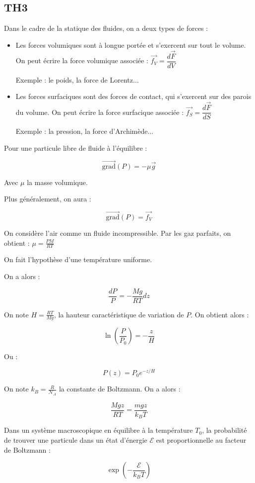 \documentclass[a4paper,12pt]{book}
\newcommand{\Def}[2]{\begin{tcolorbox}[colback=white,colframe=red!10!green!20!blue!75!, title=Définition : #1]#2\end{tcolorbox}}
\newcommand{\Thr}[2]{\begin{tcolorbox}[sharp corners, colback=white,colframe=red!10!blue!30!green!75!, title=Théorème : #1]#2\end{tcolorbox}}
\newcommand{\Grad}{\overrightarrow{\mathrm{grad}}}
\renewcommand{\Vec}[1]{\overrightarrow{#1}}
\begin{document}
\subsection{TH3}
\Def{Forces en statique des fluides}{Dans le cadre de la statique des fluides, on a deux types de forces :\begin{itemize}
\item Les forces volumiques sont à longue portée et s'exercent sur tout le volume. On peut écrire la force volumique associée : $\Vec{f_V} = \dfrac{d\Vec{F}}{dV}$
\par Exemple : le poids, la force de Lorentz...
\item Les forces surfaciques sont des forces de contact, qui s'exercent sur des parois du volume. On peut écrire la force surfacique associée : $\Vec{f_S} = \dfrac{d\Vec{F}}{dS}$
\par Exemple : la pression, la force d'Archimède...
\end{itemize}}
\Thr{Relation fondamentale de la statique des fluides}{Pour une particule libre de fluide à l'équilibre :
\par $$\Grad(P)= -\mu\Vec{g}$$
\par Avec $\mu$ la masse volumique.
\par Plus généralement, on aura :
\par $$\Grad(P) = \Vec{f_V}$$}
\Def{Modèle atmosphère isotherme}{On considère l'air comme un fluide incompressible. Par les gaz parfaits, on obtient : $\mu =\frac{PM}{RT}$
\par On fait l'hypothèse d'une température uniforme.
\par On a alors :
\par $$\dfrac{dP}{P} = -\frac{Mg}{RT}dz$$
\par On note $H = \frac{RT}{Mg}$, la hauteur caractéristique de variation de $P$. On obtient alors :
\par $$\ln\left(\frac{P}{P_0}\right) = -\frac{z}{H}$$
\par Ou :
\par $$P(z) = P_0e^{-z/H}$$}
\Thr{Facteur de Boltzman}{On note $k_B=\frac{R}{\mathcal{N}_A}$ la constante de Boltzmann. On a alors :
\par $$\frac{Mgz}{RT}=\frac{mgz}{k_BT}$$
\par Dans un système macroscopique en équilibre à la température $T_0$, la probabilité de trouver une particule dans un état d'énergie $\mathcal{E}$ est proportionnelle au facteur de Boltzmann :
\par $$\exp\left(-\frac{\mathcal{E}}{k_BT}\right)$$}
\end{document}

